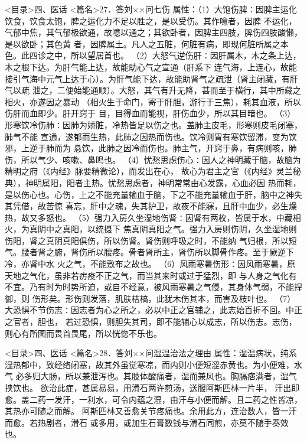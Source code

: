 \documentclass[a4paper,12pt,UTF8,twoside]{ctexbook}
\begin{document}
<目录>四、医话
<篇名>27．答刘××问七伤
属性：（1）大饱伤脾∶因脾主运化饮食，饮食太饱，脾之运化力不足以胜之，是以受伤。其作噫者，因脾 
不运化，气郁中焦，其气郁极欲通，故噫以通之；其欲卧者，因脾主四肢，脾伤四肢酸懒，是以欲卧；其色黄 
者，因脾属土。凡人之五脏，何脏有病，即现何脏所属之本色。此四诊之中，所以望居首也。 
（2）大怒气逆伤肝∶因肝属木，木之条上达，木之根下达。为肝气能上达，故能助心气之宣通（肝系下 
连气海，上连心，故能接引气海中元气上达于心）。为肝气能下达，故能助肾气之疏泄（肾主闭藏，有肝气以疏 
泄之，二便始能通顺）。大怒，其气有升无降，甚而至于横行，其中所藏之相火，亦遂因之暴动 
（相火生于命门，寄于肝胆，游行于三焦），耗其血液，所以伤肝而血即少。肝开窍于 
目，目得血而能视，肝伤血少，所以其目暗也。 
（3）形寒饮冷伤肺∶因肺为娇脏，冷热皆足以伤之也。盖肺主皮毛，形寒则皮毛闭塞，肺气不能 
宣通，遂郁而生热，此肺之因热而伤也。饮冷则胃有寒饮留滞，变为饮邪，上逆于肺而为 
悬饮，此肺之因冷而伤也。肺主气，开窍于鼻，有病则咳，肺伤，所以气少、咳嗽、鼻鸣也。 
（4）忧愁思虑伤心∶因人之神明藏于脑，故脑为精明之府（《内经》脉要精微论），而发出在心， 
故心为君主之官（《内经》灵兰秘典），神明属阳，阳者主热。忧愁思虑者，神明常常由心发露，心血必因 
热而耗，是以伤心也。心伤，上之不能充量输血于脑，下之不能充量输血于肝，脑中之神失其凭借，故苦惊 
喜忘，肝中之魂，失其护卫，故夜不能寐，且肝中血少，必生燥热，故又多怒也。 
（5）强力入房久坐湿地伤肾∶因肾有两枚，皆属于水，中藏相火，为真阴中之真阳，以统摄下 
焦真阴真阳之气。强力入房则伤阴，久坐湿地则伤阳，肾之真阴真阳俱伤，所以伤肾。肾伤则呼吸之时，不能纳 
气归根，所以短气。腰者肾之腑，肾伤所以腰疼。骨者肾所主，肾伤所以脚骨作疼。至于厥逆下冷，亦肾中水 
火之气，不能敷布之故也。 
（6）风雨寒暑伤形∶因风雨寒暑，原天地之气化，虽非若疠疫不正之气，而当其来时或过于猛烈，即 
与人身之气化有不宜。乃有时为时势所迫，或自不经意，被风雨寒暑之气侵，其身体气弱，不能捍御，则 
伤形矣。形伤则发落，肌肤枯槁，此犹木伤其本，而害及枝叶也。 
（7）大恐惧不节伤志∶因志者为心之所之，必以中正之官辅之，此志始百折不回。中正之官者，胆也， 
若过恐惧，则胆失其司，即不能辅心以成志，所以伤志。志伤，则心有所图而畏首畏尾，所以恍惚不乐也。 

<目录>四、医话
<篇名>28．答刘××问湿温治法之理由
属性：湿温病状，纯系湿热郁中，致经络闭塞，故其外虽觉寒凉，而内则小便短涩赤黄也。为小便难，水气 
必多归大肠，所以兼泄泻也。其肢体酸痛者，湿而兼风也。胸膈痞满者，湿气挟饮也。 
欲治此症，甚属易易，用滑石两许煎汤，送服阿斯匹林一片半， 
汗出即愈。盖二药一发汗，一利水，可令内蕴之湿，由汗与小便而解。且二药之性皆凉，其热亦可随之而解。 
阿斯匹林又善愈关节疼痛也。余用此方，连治数人，皆一汗而愈。若热剧者，滑石 
或多用，或加生石膏数钱与滑石同煎，亦莫不随手奏效也。 
\end{document}
